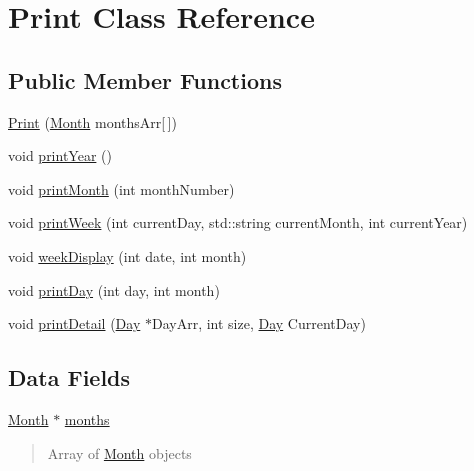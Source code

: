 \hypertarget{classPrint}{\section{Print Class Reference}
\label{classPrint}
}
\subsection*{Public Member Functions}
\begin{DoxyCompactItemize}
\item 
\hyperlink{classPrint_a7b9e4716438a4d6003fb53d740172463}{Print} (\hyperlink{classMonth}{Month} months\-Arr\mbox{[}$\,$\mbox{]})
\item 
void \hyperlink{classPrint_ab38ff940d0abba39ec72485ba3e16259}{print\-Year} ()
\item 
void \hyperlink{classPrint_a783042d8e22a1b8a0b81bbcbc9bb03f0}{print\-Month} (int month\-Number)
\item 
void \hyperlink{classPrint_a5480160313e90ae75d51255bd20a54fe}{print\-Week} (int current\-Day, std\-::string current\-Month, int current\-Year)
\item 
void \hyperlink{classPrint_a7013b300e4a36e6cd2fa8c68eab71892}{week\-Display} (int date, int month)
\item 
void \hyperlink{classPrint_adcc0b985904ceb75634e3bb0b156d033}{print\-Day} (int day, int month)
\item 
void \hyperlink{classPrint_a885ba5ae8549695d781bb03c8a3f2109}{print\-Detail} (\hyperlink{classDay}{Day} $\ast$Day\-Arr, int size, \hyperlink{classDay}{Day} Current\-Day)
\end{DoxyCompactItemize}
\subsection*{Data Fields}
\begin{DoxyCompactItemize}
\item 
\hypertarget{classPrint_a9c8bb58b547f6ffd71b735b6bb0072b1}{\hyperlink{classMonth}{Month} $\ast$ \hyperlink{classPrint_a9c8bb58b547f6ffd71b735b6bb0072b1}{months}}\label{classPrint_a9c8bb58b547f6ffd71b735b6bb0072b1}

\begin{DoxyCompactList}\small\item\em \begin{quotation}
Array of \hyperlink{classMonth}{Month} objects \end{quotation}
\end{DoxyCompactList}\end{DoxyCompactItemize}


